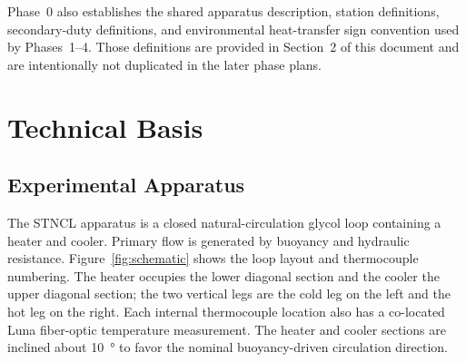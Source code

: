 \documentclass[11pt]{article}
\begin{document}
Phase~0 also establishes the shared apparatus description, station definitions, secondary-duty definitions, and environmental heat-transfer sign convention used by Phases~1--4. Those definitions are provided in Section~2 of this document and are intentionally not duplicated in the later phase plans.

\clearpage
\section{Technical Basis}
\label{sec:technical_basis}
\subsection{Experimental Apparatus}
\label{sec:functional}

The STNCL apparatus is a closed natural-circulation glycol loop containing a heater and cooler. Primary flow is generated by buoyancy and hydraulic resistance. Figure~\ref{fig:schematic} shows the loop layout and thermocouple numbering. The heater occupies the lower diagonal section and the cooler the upper diagonal section; the two vertical legs are the cold leg on the left and the hot leg on the right. Each internal thermocouple location also has a co-located Luna fiber-optic temperature measurement. The heater and cooler sections are inclined about \SI{10}{\degree} to favor the nominal buoyancy-driven circulation direction. 
\end{document}
